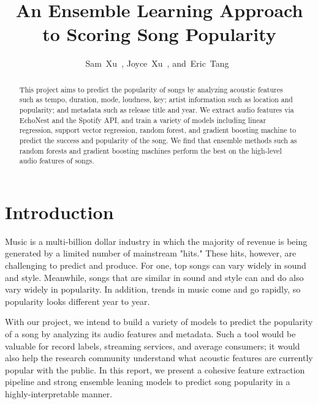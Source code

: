 \documentclass[journal]{IEEEtran}
\begin{document}
%
\title{An Ensemble Learning Approach to Scoring Song Popularity}


\author{Sam~Xu~,
        Joyce~Xu~,
        and~Eric~Tang~}


%
{}


\maketitle


\begin{abstract}
This project aims to predict the popularity of songs by analyzing acoustic features such as tempo, duration, mode, loudness, key; artist information such as location and popularity; and metadata such as release title and year. We extract audio features via EchoNest and the Spotify API, and train a variety of models including linear regression, support vector regression, random forest, and gradient boosting machine to predict the success and popularity of the song. We find that ensemble methods such as random forests and gradient boosting machines perform the best on the high-level audio features of songs.
\end{abstract}



\section{Introduction}
Music is a multi-billion dollar industry in which the majority of revenue is being generated by a limited number of mainstream "hits." These hits, however, are challenging to predict and produce. For one, top songs can vary widely in sound and style. Meanwhile, songs that are similar in sound and style can and do also vary widely in popularity. In addition, trends in music come and go rapidly, so popularity looks different year to year.

With our project, we intend to build a variety of models to predict the popularity of a song by analyzing its audio features and metadata. Such a tool would be valuable for record labels, streaming services, and average consumers; it would also help the research community understand what acoustic features are currently popular with the public. In this report, we present a cohesive feature extraction pipeline and strong ensemble leaning models to predict song popularity in a highly-interpretable manner.
\end{document}
